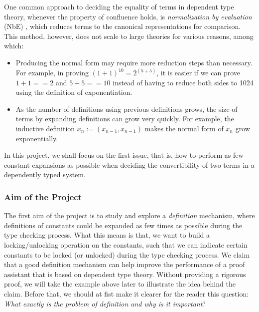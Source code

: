\documentclass{article}
\theoremstyle{remark}
\begin{document}
One common approach to deciding the equality of terms in dependent type theory, whenever the property of confluence holds, is \textit{normalization by evaluation} (NbE) \cite{berger1998normalization}, which reduces terms to the canonical representations for comparison. This method, however, does not scale to large theories for various reasons, among which:
\begin{itemize}
\item Producing the normal form may require more reduction steps than necessary. For example, in proving $(1 + 1) ^ {10} = 2 ^{(5 + 5)}$, it is easier if we can prove $1 + 1 == 2$ and $5 + 5 == 10$ instead of having to reduce both sides to 1024 using the definition of exponentiation.
\item As the number of definitions using previous definitions grows, the size of terms by expanding definitions can grow very quickly. For example, the inductive definition $x_n := (x_{n-1}, x_{n-1})$ makes the normal form of $x_{n}$ grow exponentially.
\end{itemize}
In this project, we shall focus on the first issue, that is, how to perform as few constant expansions as possible when deciding the convertibility of two terms in a dependently typed system. 

\subsubsection{Aim of the Project}
The first aim of the project is to study and explore a \emph{definition} mechanism, where definitions of constants could be expanded as few times as possible during the type checking process. What this means is that, we want to build a locking/unlocking operation on the constants, such that we can indicate certain constants to be locked (or unlocked) during the type checking process. We claim that a good definition mechanism can help improve the performance of a proof assistant that is based on dependent type theory. Without providing a rigorous proof, we will take the example above later to illustrate the idea behind the claim. Before that, we should at fist make it clearer for the reader this question: \emph{What exactly is the problem of definition and why is it important}?
\end{document}
